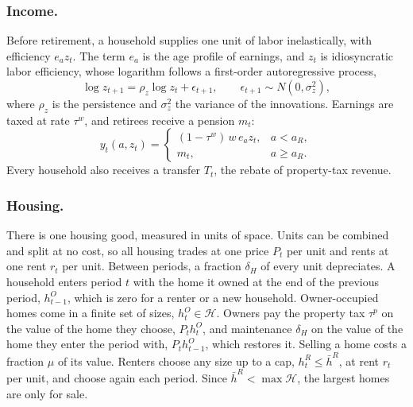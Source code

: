 \subsubsection*{Income.}
Before retirement, a household supplies one unit of labor inelastically, with
efficiency $e_az_t$. The term $e_a$ is the age profile of earnings, and $z_t$
is idiosyncratic labor efficiency, whose logarithm follows a first-order
autoregressive process,
\begin{equation*}
 \log z_{t+1}=\rho_z\log z_t+\epsilon_{t+1},\qquad
 \epsilon_{t+1}\sim N(0,\sigma_z^2),
\end{equation*}
where $\rho_z$ is the persistence and $\sigma_z^2$ the variance of the
innovations. Earnings are taxed at rate
$\tau^w$, and retirees receive a pension $m_t$:
\begin{equation*}
 y_t(a,z_t)=\begin{cases}(1-\tau^w)\,w\,e_az_t, & a<a_R,\\ m_t, & a\ge a_R.\end{cases}
\end{equation*}
Every household also receives a transfer $T_t$, the rebate of property-tax
revenue.

\subsubsection*{Housing.}
There is one housing good, measured in units of space. Units can be
combined and split at no cost, so all housing trades at one price $P_t$ per
unit and rents at one rent $r_t$ per unit. Between periods, a fraction
$\delta_H$ of every unit depreciates.
A household enters period $t$ with the home it owned at the end of the
previous period,
$h^O_{t-1}$, which is zero for a renter or a new household. Owner-occupied homes come in a finite
set of sizes, $h^O_t\in\mathcal H$. Owners pay the property tax $\tau^p$ on the value of the home they
choose, $P_th^O_t$, and maintenance $\delta_H$ on the value of the home they
enter the period with, $P_th^O_{t-1}$, which restores it. Selling a home costs a fraction $\mu$
of its value. Renters choose any size up to a cap, $h^R_t\le\bar h^R$, at rent
$r_t$ per unit, and choose again each period. Since $\bar h^R<\max\mathcal H$, the largest homes are only
for sale.

